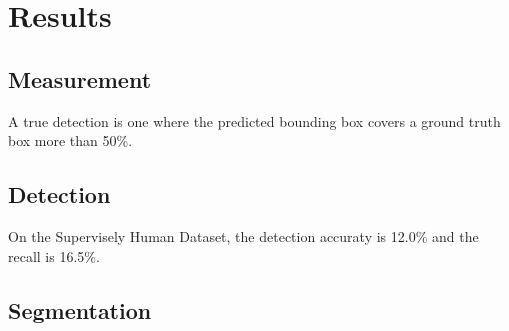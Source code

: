 \documentclass{article}
\begin{document}
\section{Results}
\subsection{Measurement}
A true detection is one where the predicted bounding box covers a ground truth box more than 50\%.

\subsection{Detection}
On the Supervisely Human Dataset, the detection accuraty is 12.0\% and the recall is 16.5\%.

\subsection{Segmentation}


\printbibliography
\end{document}
